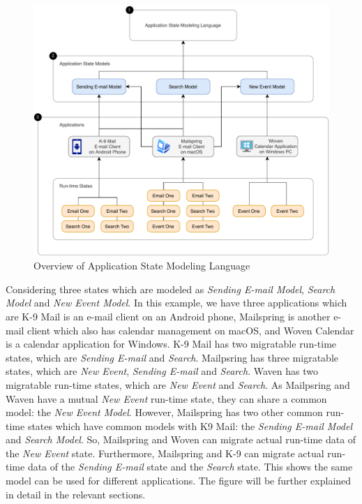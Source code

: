 \FloatBarrier
\begin{figure}[H]
    \includegraphics[scale=0.8]{../figures/asml-overview.pdf}
    \centering
    \caption{Overview of Application State Modeling Language}
    \label{fig:asml-overview}
\end{figure}
\FloatBarrier

Considering three states which are modeled as \textit{Sending E-mail Model}, \textit{Search Model} and \textit{New Event Model}. In this example, we have three applications which are K-9 Mail is an e-mail client on an Android phone, Mailspring is another e-mail client which also has calendar management on macOS, and Woven Calendar is a calendar application for Windows. K-9 Mail has two migratable run-time states, which are \textit{Sending E-mail} and \textit{Search}. Mailpsring has three migratable states, which are \textit{New Event}, \textit{Sending E-mail} and \textit{Search}. Waven has two migratable run-time states, which are \textit{New Event} and \textit{Search}. As Mailpsring and Waven have a mutual \textit{New Event} run-time state, they can share a common model: the \textit{New Event Model}. However, Mailspring has two other common run-time states which have common models with K9 Mail: the \textit{Sending E-mail Model} and \textit{Search Model}. So, Mailspring and Woven can migrate actual run-time data of the \textit{New Event} state. Furthermore, Mailspring and K-9 can migrate actual run-time data of the \textit{Sending E-mail} state and the \textit{Search} state. This shows the same model can be used for different applications. The figure will be further explained in detail in the relevant sections.

